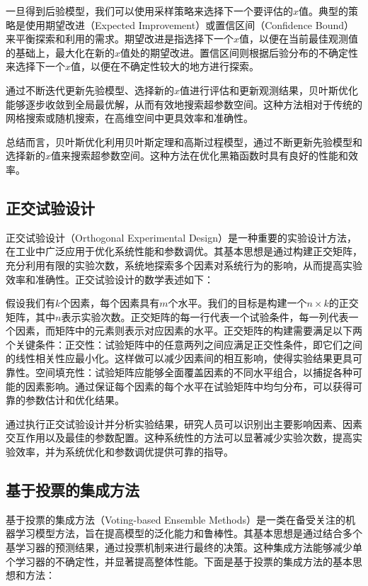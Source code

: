 \documentclass{SCIA2018cn}
\theoremstyle{mystyle}
\begin{document}
一旦得到后验模型，我们可以使用采样策略来选择下一个要评估的$x$值。典型的策略是使用期望改进（Expected Improvement）或置信区间（Confidence Bound）来平衡探索和利用的需求。期望改进是指选择下一个$x$值，以便在当前最佳观测值的基础上，最大化在新的$x$值处的期望改进。置信区间则根据后验分布的不确定性来选择下一个$x$值，以便在不确定性较大的地方进行探索。

通过不断迭代更新先验模型、选择新的$x$值进行评估和更新观测结果，贝叶斯优化能够逐步收敛到全局最优解，从而有效地搜索超参数空间。这种方法相对于传统的网格搜索或随机搜索，在高维空间中更具效率和准确性。

总结而言，贝叶斯优化利用贝叶斯定理和高斯过程模型，通过不断更新先验模型和选择新的$x$值来搜索超参数空间。这种方法在优化黑箱函数时具有良好的性能和效率。


\subsection{正交试验设计}

正交试验设计（Orthogonal Experimental Design）是一种重要的实验设计方法，在工业中广泛应用于优化系统性能和参数调优。其基本思想是通过构建正交矩阵，充分利用有限的实验次数，系统地探索多个因素对系统行为的影响，从而提高实验效率和准确性。正交试验设计的数学表述如下：

假设我们有$k$个因素，每个因素具有$m$个水平。我们的目标是构建一个$n \times k$的正交矩阵，其中$n$表示实验次数。正交矩阵的每一行代表一个试验条件，每一列代表一个因素，而矩阵中的元素则表示对应因素的水平。正交矩阵的构建需要满足以下两个关键条件：正交性：试验矩阵中的任意两列之间应满足正交性条件，即它们之间的线性相关性应最小化。这样做可以减少因素间的相互影响，使得实验结果更具可靠性。空间填充性：试验矩阵应能够全面覆盖因素的不同水平组合，以捕捉各种可能的因素影响。通过保证每个因素的每个水平在试验矩阵中均匀分布，可以获得可靠的参数估计和优化结果。

通过执行正交试验设计并分析实验结果，研究人员可以识别出主要影响因素、因素交互作用以及最佳的参数配置。这种系统性的方法可以显著减少实验次数，提高实验效率，并为系统优化和参数调优提供可靠的指导。

\subsection{基于投票的集成方法}

基于投票的集成方法（Voting-based Ensemble Methods）是一类在备受关注的机器学习模型方法，旨在提高模型的泛化能力和鲁棒性。其基本思想是通过结合多个基学习器的预测结果，通过投票机制来进行最终的决策。这种集成方法能够减少单个学习器的不确定性，并显著提高整体性能。下面是基于投票的集成方法的基本思想和方法：
\end{document}
